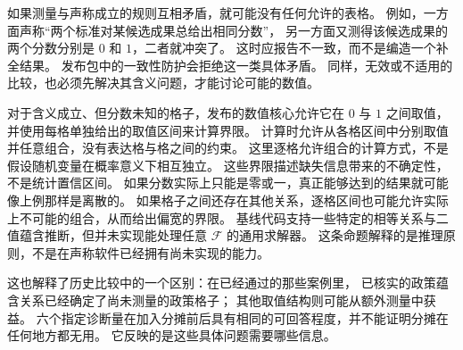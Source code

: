 如果测量与声称成立的规则互相矛盾，就可能没有任何允许的表格。
例如，一方面声称“两个标准对某候选成果总给出相同分数”，
另一方面又测得该候选成果的两个分数分别是 $0$ 和 $1$，二者就冲突了。
这时应报告不一致，而不是编造一个补全结果。
发布包中的一致性防护会拒绝这一类具体矛盾。
同样，无效或不适用的比较，也必须先解决其含义问题，才能讨论可能的数值。

对于含义成立、但分数未知的格子，发布的数值核心允许它在 $0$ 与 $1$ 之间取值，
并使用每格单独给出的取值区间来计算界限。
计算时允许从各格区间中分别取值并任意组合，没有表达格与格之间的约束。
这里逐格允许组合的计算方式，不是假设随机变量在概率意义下相互独立。
这些界限描述缺失信息带来的不确定性，不是统计置信区间。
如果分数实际上只能是零或一，真正能够达到的结果就可能像上例那样是离散的。
如果格子之间还存在其他关系，逐格区间也可能允许实际上不可能的组合，从而给出偏宽的界限。
基线代码支持一些特定的相等关系与二值蕴含推断，但并未实现能处理任意 $\mathcal F$ 的通用求解器。
这条命题解释的是推理原则，不是在声称软件已经拥有尚未实现的能力。

这也解释了历史比较中的一个区别：在已经通过的那些案例里，
已核实的政策蕴含关系已经确定了尚未测量的政策格子；
其他取值结构则可能从额外测量中获益。
六个指定诊断量在加入分摊前后具有相同的可回答程度，并不能证明分摊在任何地方都无用。
它反映的是这些具体问题需要哪些信息。
